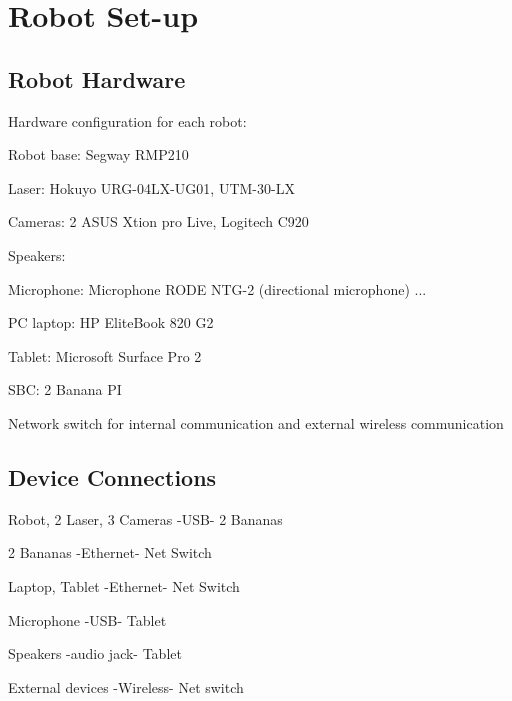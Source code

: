 \section{Robot Set-up}


\subsection{Robot Hardware}

Hardware configuration for each robot:


Robot base: Segway RMP210

Laser: Hokuyo URG-04LX-UG01,  UTM-30-LX

Cameras: 2 ASUS Xtion pro Live, Logitech C920

Speakers:

Microphone: Microphone RODE NTG-2  (directional microphone) ...

PC laptop: HP EliteBook 820 G2

Tablet: Microsoft Surface Pro 2

SBC: 2 Banana PI

Network switch for internal communication and external wireless communication


\subsection{Device Connections}

Robot, 2 Laser, 3 Cameras -USB- 2 Bananas

2 Bananas -Ethernet- Net Switch

Laptop, Tablet -Ethernet- Net Switch

Microphone -USB- Tablet

Speakers -audio jack- Tablet

External devices -Wireless- Net switch






